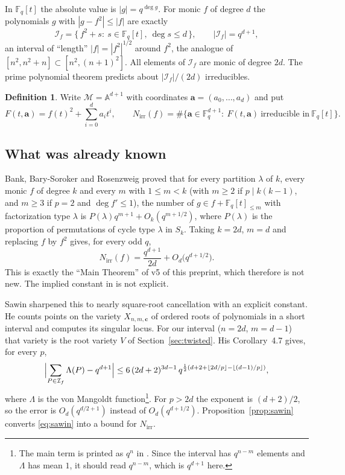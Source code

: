 \documentclass[11pt,a4paper]{article}
\theoremstyle{definition}
\newtheorem{definition}[theorem]{Definition}
\theoremstyle{remark}
\newcommand{\Fq}{\mathbb{F}_q}
\newcommand{\A}{\mathbb{A}}
\newcommand{\Nirr}{N_{\mathrm{irr}}}
\newcommand{\cI}{\mathcal{I}}
\newcommand{\cM}{\mathcal{M}}
\newcommand{\ba}{\mathbf{a}}
\begin{document}
In $\Fq[t]$ the absolute value is $|g|=q^{\deg g}$. For monic $f$ of degree
$d$ the polynomials $g$ with $|g-f^2|\le|f|$ are exactly
\[
  \cI_f=\{\,f^2+s:\ s\in\Fq[t],\ \deg s\le d\,\},\qquad |\cI_f|=q^{d+1},
\]
an interval of ``length'' $|f|=|f^2|^{1/2}$ around $f^2$, the analogue of
$[n^2,n^2+n]\subset[n^2,(n+1)^2]$. All elements of $\cI_f$ are monic of degree $2d$.
The prime polynomial theorem predicts about $|\cI_f|/(2d)$ irreducibles.

\begin{definition}\label{def:interval}
Write $\cM=\A^{d+1}$ with coordinates $\ba=(a_0,\dots,a_d)$ and put
\[
  F(t,\ba)=f(t)^2+\sum_{i=0}^{d}a_it^i,\qquad
  \Nirr(f)=\#\{\ba\in\Fq^{d+1}:\ F(t,\ba)\ \text{irreducible in}\ \Fq[t]\}.
\]
\end{definition}

\subsection{What was already known}
Bank, Bary-Soroker and Rosenzweig \cite{BBR2015} proved that for every
partition $\lambda$ of $k$, every monic $f$ of degree $k$ and every $m$ with
$1\le m<k$ (with $m\ge2$ if $p\mid k(k-1)$, and $m\ge 3$ if $p=2$ and
$\deg f'\le 1$), the number of $g\in f+\Fq[t]_{\le m}$ with factorization type
$\lambda$ is $P(\lambda)q^{m+1}+O_k(q^{m+1/2})$, where $P(\lambda)$ is the
proportion of permutations of cycle type $\lambda$ in $S_k$.
Taking $k=2d$, $m=d$ and replacing $f$ by $f^2$ gives, for every odd $q$,
\begin{equation}\label{eq:BBR}
  \Nirr(f)=\frac{q^{d+1}}{2d}+O_d\bigl(q^{d+1/2}\bigr).
\end{equation}
This is exactly the ``Main Theorem'' of v5 of this preprint, which therefore
is not new. The implied constant in \cite{BBR2015} is not explicit.

Sawin \cite{Sawin2021} sharpened this to nearly square-root cancellation with an explicit
constant. He counts points on the variety $X_{n,m,\mathbf c}$ of ordered roots of polynomials
in a short interval and computes its singular locus. For our interval ($n=2d$, $m=d-1$) that
variety is the root variety $V$ of Section~\ref{sec:twisted}. His Corollary~4.7 gives, for every $p$,
\begin{equation}\label{eq:sawin}
  \Bigl|\sum_{P\in\cI_f}\Lambda(P)-q^{d+1}\Bigr|
  \le 6\,(2d+2)^{3d-1}\,q^{\frac12\left(d+2+\lfloor 2d/p\rfloor-\lfloor (d-1)/p\rfloor\right)},
\end{equation}
where $\Lambda$ is the von Mangoldt function\footnote{The main term is printed as $q^n$ in
\cite[Cor.~4.7]{Sawin2021}. Since the interval has $q^{n-m}$ elements and $\Lambda$ has mean $1$,
it should read $q^{n-m}$, which is $q^{d+1}$ here.}.
For $p>2d$ the exponent is $(d+2)/2$, so the error is $O_d(q^{d/2+1})$ instead of $O_d(q^{d+1/2})$.
Proposition~\ref{prop:sawin} converts \eqref{eq:sawin} into a bound for $\Nirr$.
\end{document}

